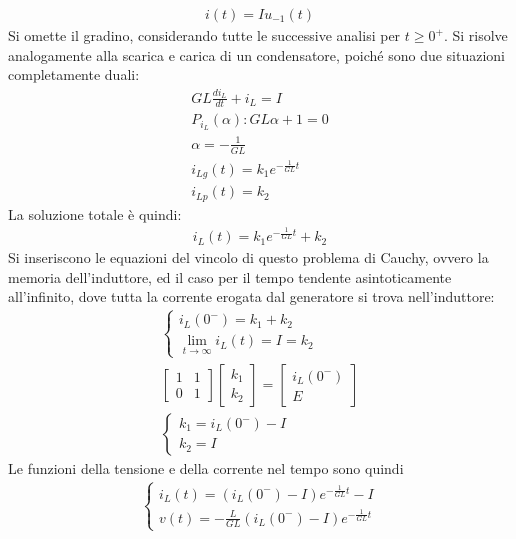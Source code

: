 \documentclass{article}
\numberwithin{equation}{subsection}
\begin{document}
\begin{gather*}
    i(t)=Iu_{-1}(t)
\end{gather*}
Si omette il gradino, considerando tutte le successive analisi per $t\geq0^+$. Si risolve analogamente alla scarica e carica di un condensatore, poiché sono due situazioni 
completamente duali:
\begin{gather*}
    GL\displaystyle\frac{di_L}{dt}+i_L=I\\
    P_{i_L}(\alpha):GL\alpha+1=0\\
    \alpha=\displaystyle-\frac{1}{GL}\\
    i_{Lg}(t)=k_1e^{-\frac{1}{GL}t}\\
    i_{Lp}(t)=k_2
\end{gather*}
La soluzione totale è quindi:
\begin{gather*}
    i_L(t)=k_1e^{-\frac{1}{GL}t}+k_2
\end{gather*}
Si inseriscono le equazioni del vincolo di questo problema di Cauchy, ovvero la memoria dell'induttore, ed il caso per il tempo tendente asintoticamente all'infinito, dove 
tutta la corrente erogata dal generatore si trova nell'induttore:
\begin{gather*}
    \begin{cases}
        i_L(0^-)=k_1+k_2\\
        \displaystyle\lim_{t\to\infty}i_L(t)=I=k_2
    \end{cases}\\
    \begin{bmatrix}
        1&1\\0&1
    \end{bmatrix}\begin{bmatrix}
        k_1\\k_2
    \end{bmatrix}=\begin{bmatrix}
        i_L(0^-)\\E
    \end{bmatrix}\\
    \begin{cases}
        k_1=i_L(0^-)-I\\
        k_2=I
    \end{cases}
\end{gather*}
Le funzioni della tensione e della corrente nel tempo sono quindi
\begin{gather*}
    \begin{cases}
        i_L(t)=(i_L(0^-)-I)e^{-\frac{1}{GL}t}-I\\
        v(t)=\displaystyle-\frac{L}{GL}(i_L(0^-)-I)e^{-\frac{1}{GL}t}
    \end{cases}
\end{gather*}
\end{document}
